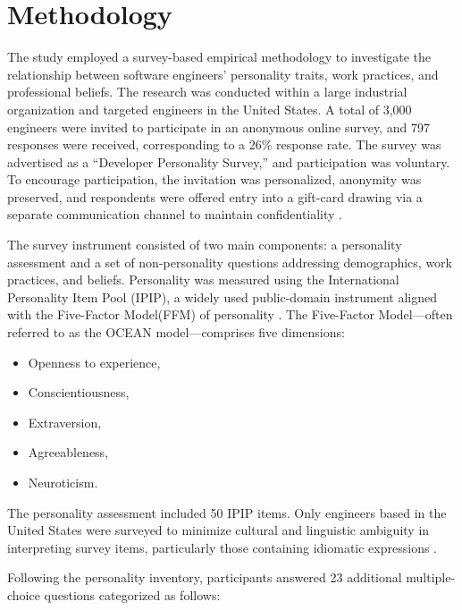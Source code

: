 \section{Methodology}
The study employed a survey-based empirical methodology to investigate the relationship between software engineers’ personality traits, work practices, and professional beliefs. The research was conducted within a large industrial organization and targeted engineers in the United States. A total of 3,000 engineers were invited to participate in an anonymous online survey, and 797 responses were received, corresponding to a 26\% response rate. The survey was advertised as a “Developer Personality Survey,” and participation was voluntary. To encourage participation, the invitation was personalized, anonymity was preserved, and respondents were offered entry into a gift-card drawing via a separate communication channel to maintain confidentiality .

The survey instrument consisted of two main components: a personality assessment and a set of non-personality questions addressing demographics, work practices, and beliefs. Personality was measured using the International Personality Item Pool (IPIP), a widely used public-domain instrument aligned with the Five-Factor Model\footnotemark[1] (FFM) of personality \cite{Goldberg2006}. The Five-Factor Model—often referred to as the OCEAN model—comprises five dimensions:

\begin{itemize}
    \item Openness to experience,
    \item Conscientiousness,
    \item Extraversion,
    \item Agreeableness,
    \item Neuroticism.
\end{itemize}

The personality assessment included 50 IPIP items. Only engineers based in the United States were surveyed to minimize cultural and linguistic ambiguity in interpreting survey items, particularly those containing idiomatic expressions .

Following the personality inventory, participants answered 23 additional multiple-choice questions categorized as follows:

